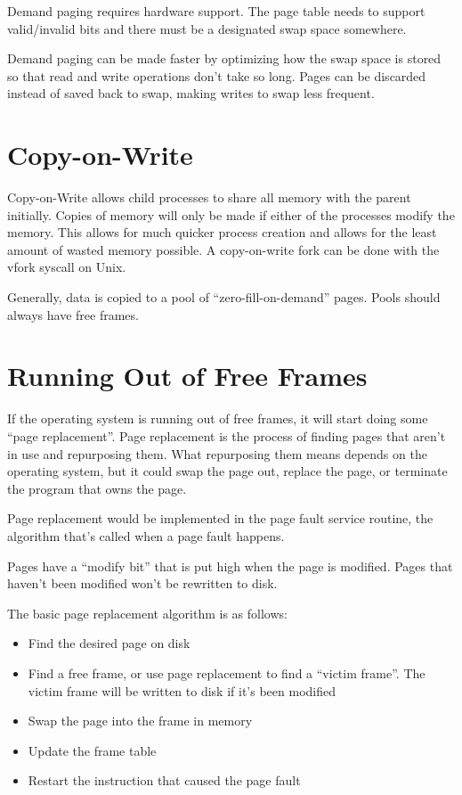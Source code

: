 \documentclass{article}
\begin{document}
Demand paging requires hardware support. The page table needs to support
valid/invalid bits and there must be a designated swap space somewhere.

Demand paging can be made faster by optimizing how the swap space is stored so
that read and write operations don't take so long. Pages can be discarded
instead of saved back to swap, making writes to swap less frequent.

\section{Copy-on-Write}
Copy-on-Write allows child processes to share all memory with the parent
initially. Copies of memory will only be made if either of the processes
modify the memory. This allows for much quicker process creation and allows for
the least amount of wasted memory possible. A copy-on-write fork can be done
with the vfork syscall on Unix.


Generally, data is copied to a pool of ``zero-fill-on-demand'' pages. Pools
should always have free frames.

\section{Running Out of Free Frames}
If the operating system is running out of free frames, it will start doing
some ``page replacement''. Page replacement is the process of finding pages
that aren't in use and repurposing them. What repurposing them means depends on
the operating system, but it could swap the page out, replace the page, or
terminate the program that owns the page.

Page replacement would be implemented in the page fault service routine, the
algorithm that's called when a page fault happens.

Pages have a ``modify bit'' that is put high when the page is modified. Pages
that haven't been modified won't be rewritten to disk.

The basic page replacement algorithm is as follows:

\begin{itemize}
	\item Find the desired page on disk
	\item Find a free frame, or use page replacement to find a ``victim
		frame''. The victim frame will be written to disk if it's been
		modified
	\item Swap the page into the frame in memory
	\item Update the frame table
	\item Restart the instruction that caused the page fault
\end{itemize}
\end{document}
